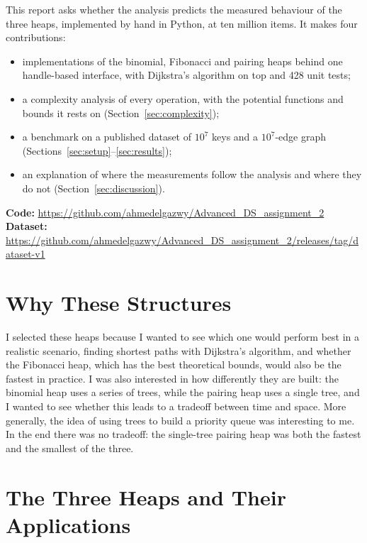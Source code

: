 \documentclass[acmsmall,nonacm]{acmart}
\begin{document}
This report asks whether the analysis predicts the measured behaviour of the
three heaps, implemented by hand in Python, at ten million items. It makes four
contributions:
\begin{itemize}
  \item implementations of the binomial, Fibonacci and pairing heaps behind one handle-based interface, with Dijkstra's algorithm on top and 428 unit tests;
  \item a complexity analysis of every operation, with the potential functions and bounds it rests on (Section~\ref{sec:complexity});
  \item a benchmark on a published dataset of $10^7$ keys and a $10^7$-edge graph (Sections~\ref{sec:setup}--\ref{sec:results});
  \item an explanation of where the measurements follow the analysis and where they do not (Section~\ref{sec:discussion}).
\end{itemize}

\noindent\textbf{Code:} \url{https://github.com/ahmedelgazwy/Advanced_DS_assignment_2}\\
\textbf{Dataset:} \url{https://github.com/ahmedelgazwy/Advanced_DS_assignment_2/releases/tag/dataset-v1}

\section{Why These Structures}
\label{sec:why}

I selected these heaps because I wanted to see which one would perform best in
a realistic scenario, finding shortest paths with Dijkstra's algorithm, and
whether the Fibonacci heap, which has the best theoretical bounds, would also
be the fastest in practice. I was also interested in how differently they are
built: the binomial heap uses a series of trees, while the pairing heap uses a
single tree, and I wanted to see whether this leads to a tradeoff between time
and space. More generally, the idea of using trees to build a priority queue
was interesting to me. In the end there was no tradeoff: the single-tree
pairing heap was both the fastest and the smallest of the three.

\section{The Three Heaps and Their Applications}
\label{sec:structures}
\end{document}
